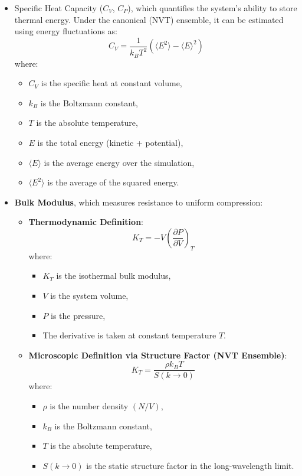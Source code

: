 \documentclass[12pt]{article}
\begin{document}
\begin{itemize}
    \item Specific Heat Capacity (\(C_V\), \(C_P\)), which quantifies the system's ability to store thermal energy. Under the canonical (NVT) ensemble, it can be estimated using energy fluctuations as:
    \[
    C_V = \frac{1}{k_B T^2} \left( \langle E^2 \rangle - \langle E \rangle^2 \right)
    \]
    where:
    \begin{itemize}
        \item \(C_V\) is the specific heat at constant volume,
        \item \(k_B\) is the Boltzmann constant,
        \item \(T\) is the absolute temperature,
        \item \(E\) is the total energy (kinetic + potential),
        \item \(\langle E \rangle\) is the average energy over the simulation,
        \item \(\langle E^2 \rangle\) is the average of the squared energy.
    \end{itemize}
\end{itemize}

\begin{itemize}
    \item \textbf{Bulk Modulus}, which measures resistance to uniform compression:

    \begin{itemize}
        \item \textbf{Thermodynamic Definition}:
        \[
        K_T = -V \left( \frac{\partial P}{\partial V} \right)_T
        \]
        where:
        \begin{itemize}
            \item \( K_T \) is the isothermal bulk modulus,
            \item \( V \) is the system volume,
            \item \( P \) is the pressure,
            \item The derivative is taken at constant temperature \( T \).
        \end{itemize}

        \item \textbf{Microscopic Definition via Structure Factor (NVT Ensemble)}:
        \[
        K_T = \frac{\rho k_B T}{S(k \to 0)}
        \]
        where:
        \begin{itemize}
            \item \( \rho \) is the number density \( (N/V) \),
            \item \( k_B \) is the Boltzmann constant,
            \item \( T \) is the absolute temperature,
            \item \( S(k \to 0) \) is the static structure factor in the long-wavelength limit.
        \end{itemize}
    \end{itemize}
\end{itemize}
\end{document}
